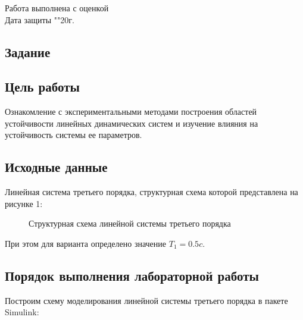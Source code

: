 \documentclass[a4paper, 11pt]{article}
\begin{document}
\begin{titlepage}
		Работа выполнена с оценкой \hspace{1cm} \underline{\hspace{8cm}} \\ 
		\vspace{1cm}
		Дата защиты "\underline{\hspace{0.7cm}}"\hspace{0.2cm}\underline{\hspace{2cm}}\hspace{0.2cm}20\underline{\hspace{0.7cm}}г.

\end{titlepage}

\begin{center}
\section*{Задание}
\end{center}

\subsection*{Цель работы} 
Ознакомление с экспериментальными методами построения областей устойчивости линейных динамических систем и изучение влияния на устойчивость системы ее параметров.

\subsection*{Исходные данные}
\par
Линейная система третьего порядка, структурная схема которой представлена на рисунке 1:

\begin{figure}[h!]
\caption{Структурная схема линейной системы третьего порядка}
\label{ris:image}
\end{figure}

\par 
При этом для варианта определено значение $T_1=0.5c$.

\newpage
\begin{center}
\section{Порядок выполнения лабораторной работы}
\end{center}
\par 
Построим схему моделирования линейной системы третьего порядка в пакете Simulink:
\end{document}
